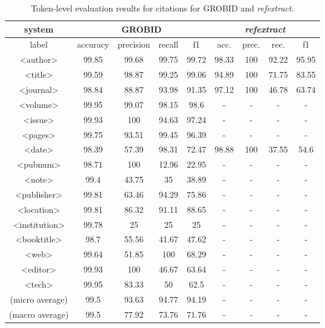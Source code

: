 \begin{table}[h]
\begin{center}
\begin{tabular}{|c|cccc|cccc|}
\hline
system &  \multicolumn{4}{c|}{GROBID} & \multicolumn{4}{c|}{\emph{refextract}}\\
\hline
label & accuracy & precision & recall & f1 & acc. & prec. & rec. & f1\\
\hline
<author>    & 99.85 &   99.68   &   99.75   &   99.72   & 98.33 &   100 &   92.22   &   95.95   \\
<title> &   99.59   &   98.87   &   99.25   &   99.06   & 94.89 &   100 &   71.75   &   83.55   \\
<journal>   & 98.84 &   88.87   &   93.98   &   91.35   & 97.12 &   100 &   46.78   &   63.74   \\
<volume>&   99.95   &   99.07   &   98.15   &   98.6    & -     &   -   &   -       &   -   \\
<issue> &   99.93   &   100     &   94.63   &   97.24   & -     &   -   &   -       &   -   \\
<pages> &   99.75   &   93.51   &   99.45   &   96.39   & -     &   -   &   -       &   -   \\
<date>  &   98.39   &   57.39   &   98.31   &   72.47   & 98.88 &   100 &   37.55   &   54.6    \\
<pubnum>&   98.71   &   100     &   12.96   &   22.95   & -     &   -   &   -       &   -   \\
<note>  &   99.4    &   43.75   &   35      &   38.89   & -     &   -   &   -       &   -   \\
<publisher>&99.81   &   63.46   &   94.29   &   75.86   & -     &   -   &   -       &   -   \\
<location>& 99.81   &   86.32   &   91.11   &   88.65   & -     &   -   &   -       &   -   \\
<institution>& 99.78&   25      &   25      &   25      & -     &   -   &   -       &   -   \\
<booktitle>&    98.7&   55.56   &   41.67   &   47.62   & -     &   -   &   -       &   -   \\
<web>   &   99.64   &   51.85   &   100     &   68.29   & -     &   -   &   -       &   -   \\
<editor>    &  99.93&   100     &	46.67   &   63.64   & -     &   -   &   -       &   -   \\
<tech>  &   99.95   &   83.33   &   50      &   62.5    & -     &   -   &   -       &   -   \\
\hline
(micro average) & 99.5  &   93.63   &   94.77   &   94.19 & -    &   - &   -   &   -   \\
(macro average) & 99.5  &   77.92   &   73.76   &   71.76 & -    &   -  &   -   &   -   \\
\hline
\end{tabular}
\caption[Token-level evaluation results for citations for GROBID and \emph{refextract}.]{Token-level evaluation results for citations for GROBID and \emph{refextract}.}
\label{table:citationcomparison}
\end{center}
\end{table}

